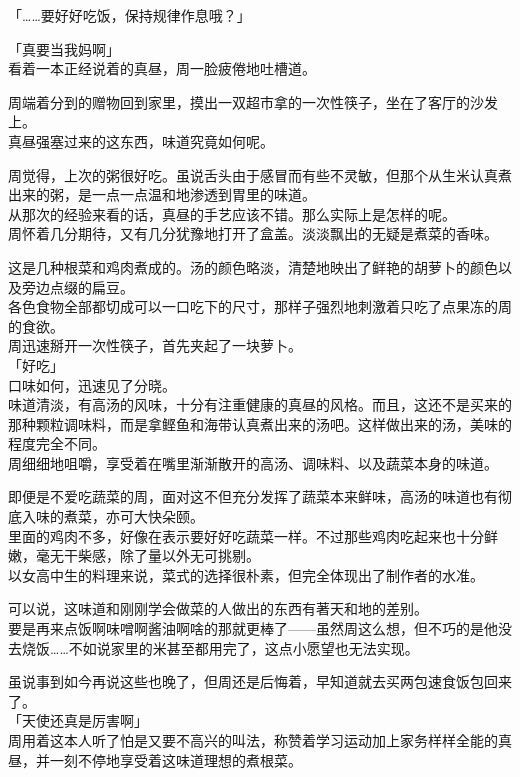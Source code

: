 「……要好好吃饭，保持规律作息哦？」

「真要当我妈啊」\\

看着一本正经说着的真昼，周一脸疲倦地吐槽道。\\

\vspace{2\baselineskip}

周端着分到的赠物回到家里，摸出一双超市拿的一次性筷子，坐在了客厅的沙发上。\\

真昼强塞过来的这东西，味道究竟如何呢。

周觉得，上次的粥很好吃。虽说舌头由于感冒而有些不灵敏，但那个从生米认真煮出来的粥，是一点一点温和地渗透到胃里的味道。\\

从那次的经验来看的话，真昼的手艺应该不错。那么实际上是怎样的呢。\\

周怀着几分期待，又有几分犹豫地打开了盒盖。淡淡飘出的无疑是煮菜的香味。

这是几种根菜和鸡肉煮成的。汤的颜色略淡，清楚地映出了鲜艳的胡萝卜的颜色以及旁边点缀的扁豆。\\

各色食物全部都切成可以一口吃下的尺寸，那样子强烈地刺激着只吃了点果冻的周的食欲。\\

周迅速掰开一次性筷子，首先夹起了一块萝卜。\\

「好吃」\\

口味如何，迅速见了分晓。\\

味道清淡，有高汤的风味，十分有注重健康的真昼的风格。而且，这还不是买来的那种颗粒调味料，而是拿鲣鱼和海带认真煮出来的汤吧。这样做出来的汤，美味的程度完全不同。\\

周细细地咀嚼，享受着在嘴里渐渐散开的高汤、调味料、以及蔬菜本身的味道。

即便是不爱吃蔬菜的周，面对这不但充分发挥了蔬菜本来鲜味，高汤的味道也有彻底入味的煮菜，亦可大快朵颐。\\

里面的鸡肉不多，好像在表示要好好吃蔬菜一样。不过那些鸡肉吃起来也十分鲜嫩，毫无干柴感，除了量以外无可挑剔。\\

以女高中生的料理来说，菜式的选择很朴素，但完全体现出了制作者的水准。

可以说，这味道和刚刚学会做菜的人做出的东西有著天和地的差别。\\

要是再来点饭啊味噌啊酱油啊啥的那就更棒了——虽然周这么想，但不巧的是他没去烧饭……不如说家里的米甚至都用完了，这点小愿望也无法实现。

虽说事到如今再说这些也晚了，但周还是后悔着，早知道就去买两包速食饭包回来了。\\

「天使还真是厉害啊」\\

周用着这本人听了怕是又要不高兴的叫法，称赞着学习运动加上家务样样全能的真昼，并一刻不停地享受着这味道理想的煮根菜。
